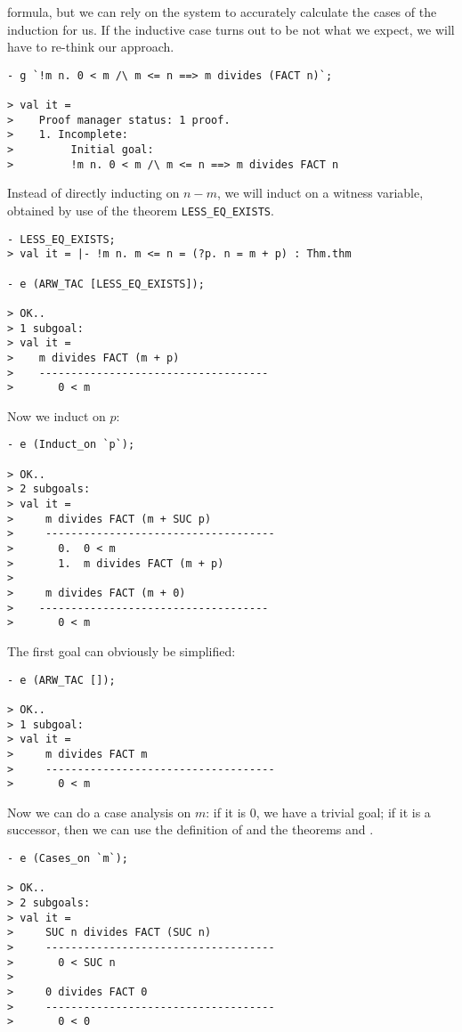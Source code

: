 formula, but we can rely on the system to accurately calculate the
cases of the induction for us. If the inductive case turns out to be
not what we expect, we will have to re-think our approach.
\begin{session}\begin{verbatim}
- g `!m n. 0 < m /\ m <= n ==> m divides (FACT n)`;

> val it =
>    Proof manager status: 1 proof.
>    1. Incomplete:
>         Initial goal:
>         !m n. 0 < m /\ m <= n ==> m divides FACT n
\end{verbatim}\end{session}
Instead of directly inducting on $n-m$, we will induct on a witness
variable, obtained by use of the theorem \verb+LESS_EQ_EXISTS+.
\begin{session}\begin{verbatim}
- LESS_EQ_EXISTS;
> val it = |- !m n. m <= n = (?p. n = m + p) : Thm.thm

- e (ARW_TAC [LESS_EQ_EXISTS]);

> OK..
> 1 subgoal:
> val it =
>    m divides FACT (m + p)
>    ------------------------------------
>       0 < m
\end{verbatim}\end{session}
\noindent Now we induct on $p$:
\begin{session}\begin{verbatim}
- e (Induct_on `p`);

> OK..
> 2 subgoals:
> val it =
>     m divides FACT (m + SUC p)
>     ------------------------------------
>       0.  0 < m
>       1.  m divides FACT (m + p)
>
>     m divides FACT (m + 0)
>    ------------------------------------
>       0 < m
\end{verbatim}\end{session}
\noindent The first goal can obviously be simplified:
\begin{session}\begin{verbatim}
- e (ARW_TAC []);

> OK..
> 1 subgoal:
> val it =
>     m divides FACT m
>     ------------------------------------
>       0 < m
\end{verbatim}\end{session}
\noindent Now we can do a case analysis on $m$: if it is $0$, we have a
trivial goal; if it is a successor, then we can use the definition of
 and the theorems  and
.
\begin{session}\begin{verbatim}
- e (Cases_on `m`);

> OK..
> 2 subgoals:
> val it =
>     SUC n divides FACT (SUC n)
>     ------------------------------------
>       0 < SUC n
>
>     0 divides FACT 0
>     ------------------------------------
>       0 < 0
\end{verbatim}\end{session}

